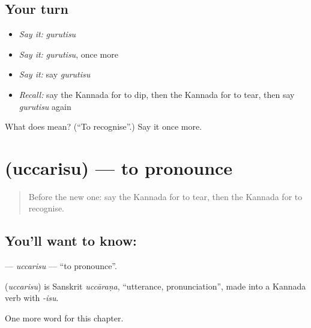 \subsection*{Your turn}
\begin{itemize}
\raggedright
  \item \emph{Say it:} \emph{gurutisu}
  \item \emph{Say it:} \emph{gurutisu}, once more
  \item \emph{Say it:} say \emph{gurutisu}
  \item \emph{Recall:} say the Kannada for to dip, then the Kannada for to tear, then say \emph{gurutisu} again
\end{itemize}

\begin{tcolorbox}[breakable,colback=teal!4,colframe=teal!35!black,title={Before you move on}]
What does  mean? (\textquotedblleft{}To recognise\textquotedblright{}.) Say it once more.
\end{tcolorbox}
\section[\texorpdfstring{\kn{ಉಚ್ಚರಿಸು} (uccarisu)}{ಉಚ್ಚರಿಸು (uccarisu)}]{ (uccarisu) — to pronounce}

\label{lesson:KA-C243-uccarisu}



\begin{quote}
Before the new one: say the Kannada for to tear, then the Kannada for to recognise.
\end{quote}

\subsection*{You'll want to know: }
\textbf{} — \emph{uccarisu} — \textquotedblleft{}to pronounce\textquotedblright{}.

\begin{cousinweb}
\textbf{} (\emph{uccarisu}) is Sanskrit \emph{uccāraṇa}, \textquotedblleft{}utterance, pronunciation\textquotedblright{}, made into a Kannada verb with \emph{-isu}.
\end{cousinweb}

\begin{grammarlens}[title={What you've built}]
One more word for this chapter.
\end{grammarlens}

